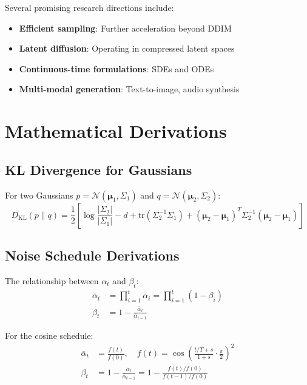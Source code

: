\documentclass[11pt,a4paper]{article}
\theoremstyle{definition}
\newcommand{\N}{\mathcal{N}}
\newcommand{\KL}{\text{KL}}
\begin{document}
Several promising research directions include:
\begin{itemize}
    \item \textbf{Efficient sampling}: Further acceleration beyond DDIM
    \item \textbf{Latent diffusion}: Operating in compressed latent spaces
    \item \textbf{Continuous-time formulations}: SDEs and ODEs
    \item \textbf{Multi-modal generation}: Text-to-image, audio synthesis
\end{itemize}

\appendix

\section{Mathematical Derivations}

\subsection{KL Divergence for Gaussians}

For two Gaussians $p = \N(\bm{\mu}_1, \Sigma_1)$ and $q = \N(\bm{\mu}_2, \Sigma_2)$:
\begin{equation}
    D_{\KL}(p \| q) = \frac{1}{2}\left[\log\frac{|\Sigma_2|}{|\Sigma_1|} - d + \text{tr}(\Sigma_2^{-1}\Sigma_1) + (\bm{\mu}_2 - \bm{\mu}_1)^T\Sigma_2^{-1}(\bm{\mu}_2 - \bm{\mu}_1)\right]
\end{equation}

\subsection{Noise Schedule Derivations}

The relationship between $\alpha_t$ and $\beta_t$:
\begin{align}
    \bar{\alpha}_t &= \prod_{i=1}^t \alpha_i = \prod_{i=1}^t (1 - \beta_i) \\
    \beta_t &= 1 - \frac{\bar{\alpha}_t}{\bar{\alpha}_{t-1}}
\end{align}

For the cosine schedule:
\begin{align}
    \bar{\alpha}_t &= \frac{f(t)}{f(0)}, \quad f(t) = \cos\left(\frac{t/T + s}{1 + s} \cdot \frac{\pi}{2}\right)^2 \\
    \beta_t &= 1 - \frac{\bar{\alpha}_t}{\bar{\alpha}_{t-1}} = 1 - \frac{f(t)/f(0)}{f(t-1)/f(0)}
\end{align}
\end{document}
